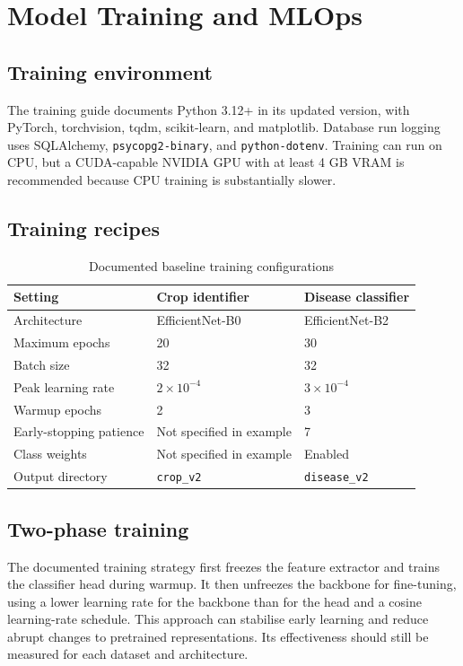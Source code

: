 \documentclass[12pt,a4paper,oneside,openany]{report}
\begin{document}
\chapter{Model Training and MLOps}
\section{Training environment}
The training guide documents Python 3.12+ in its updated version, with PyTorch, torchvision, tqdm, scikit-learn, and matplotlib. Database run logging uses SQLAlchemy, \texttt{psycopg2-binary}, and \texttt{python-dotenv}. Training can run on CPU, but a CUDA-capable NVIDIA GPU with at least 4 GB VRAM is recommended because CPU training is substantially slower.

\section{Training recipes}
\begin{table}[htbp]
\centering
\caption{Documented baseline training configurations}\label{tab:training-configs}
\begin{tabularx}{\textwidth}{lXX}
\toprule
\textbf{Setting} & \textbf{Crop identifier} & \textbf{Disease classifier}\\
\midrule
Architecture & EfficientNet-B0 & EfficientNet-B2\\
Maximum epochs & 20 & 30\\
Batch size & 32 & 32\\
Peak learning rate & $2\times10^{-4}$ & $3\times10^{-4}$\\
Warmup epochs & 2 & 3\\
Early-stopping patience & Not specified in example & 7\\
Class weights & Not specified in example & Enabled\\
Output directory & \texttt{crop\_v2} & \texttt{disease\_v2}\\
\bottomrule
\end{tabularx}
\end{table}

\section{Two-phase training}
The documented training strategy first freezes the feature extractor and trains the classifier head during warmup. It then unfreezes the backbone for fine-tuning, using a lower learning rate for the backbone than for the head and a cosine learning-rate schedule. This approach can stabilise early learning and reduce abrupt changes to pretrained representations. Its effectiveness should still be measured for each dataset and architecture.
\end{document}

